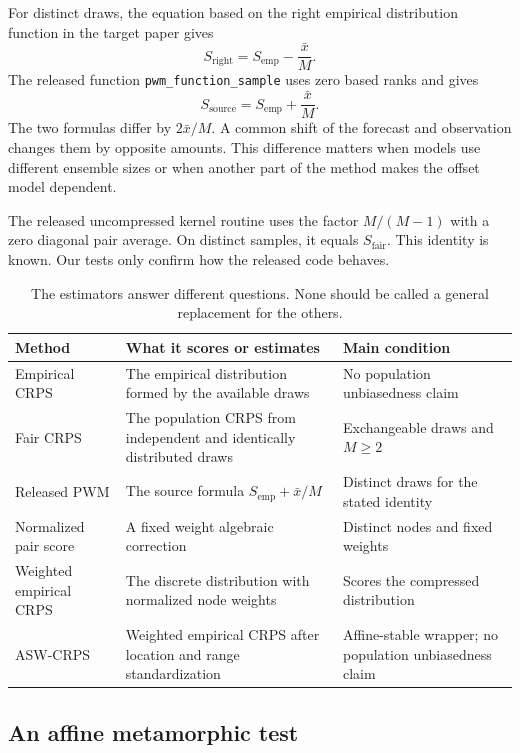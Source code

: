 \documentclass[11pt]{article}
\begin{document}
For distinct draws, the equation based on the right empirical distribution function in the target paper gives
\[
S_{\mathrm{right}}=S_{\mathrm{emp}}-\frac{\bar{x}}{M}.
\]
The released function \texttt{pwm\_function\_sample} uses zero based ranks and gives
\[
S_{\mathrm{source}}=S_{\mathrm{emp}}+\frac{\bar{x}}{M}.
\]
The two formulas differ by $2\bar{x}/M$. A common shift of the forecast and observation changes them by opposite amounts. This difference matters when models use different ensemble sizes or when another part of the method makes the offset model dependent.

The released uncompressed kernel routine uses the factor $M/(M-1)$ with a zero diagonal pair average. On distinct samples, it equals $S_{\mathrm{fair}}$. This identity is known. Our tests only confirm how the released code behaves.

\begin{table}[htbp]
\centering
\caption{The estimators answer different questions. None should be called a general replacement for the others.}
\small
\begin{tabularx}{\textwidth}{>{\raggedright\arraybackslash}p{}X>{\raggedright\arraybackslash}p{}}
\toprule
Method & What it scores or estimates & Main condition \\
\midrule
Empirical CRPS & The empirical distribution formed by the available draws & No population unbiasedness claim \\
Fair CRPS & The population CRPS from independent and identically distributed draws & Exchangeable draws and $M\geq2$ \\
Released PWM & The source formula $S_{\mathrm{emp}}+\bar{x}/M$ & Distinct draws for the stated identity \\
Normalized pair score & A fixed weight algebraic correction & Distinct nodes and fixed weights \\
Weighted empirical CRPS & The discrete distribution with normalized node weights & Scores the compressed distribution \\
ASW-CRPS & Weighted empirical CRPS after location and range standardization & Affine-stable wrapper; no population unbiasedness claim \\
\bottomrule
\end{tabularx}
\end{table}

\subsection*{An affine metamorphic test}
\end{document}
